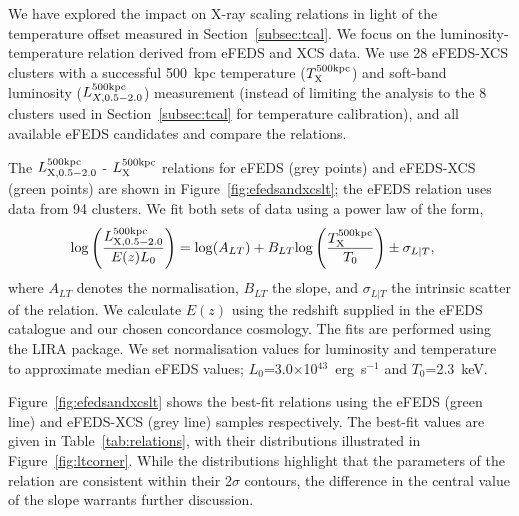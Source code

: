 \documentclass[fleqn,usenatbib]{mnras}
\begin{document}
\label{subsec:LT}
We have explored the impact on X-ray scaling relations in light of the temperature offset measured in Section~\ref{subsec:tcal}.  We focus on the luminosity-temperature relation derived from eFEDS and XCS data.  
We use 28 eFEDS-XCS clusters with a successful 500~kpc temperature ($T^{\rm 500kpc}_{\rm X}$) and soft-band luminosity ($L^{\rm 500kpc}_{X,0.5-2.0}$) measurement (instead of limiting the analysis to the 8 clusters used in Section~\ref{subsec:tcal} for temperature calibration), and all available eFEDS candidates and compare the relations.  

The $L^{500\rm{kpc}}_{\rm{X,0.5-2.0}}$ - $L_{\rm{X}}^{500\rm{kpc}}$ relations for eFEDS (grey points) and eFEDS-XCS (green points) are shown in Figure~\ref{fig:efedsandxcslt}; the eFEDS relation uses data from 94 clusters.
We fit both sets of data using a power law of the form, 
\begin{align}
{\rm log}\left(\frac{L^{500\rm{kpc}}_{\rm{X,0.5-2.0}}}{E(z)L_{0}}\right) &= {\rm log}(A_{LT}) + B_{LT}{\rm log}\left(\frac{T^{\rm{500kpc}}_{\rm{X}}}{T_{0}}\right) \pm \sigma_{L|T},
\label{equ:lt}
\end{align}
where $A_{LT}$ denotes the normalisation, $B_{LT}$ the slope, and $\sigma_{L|T}$ the intrinsic scatter of the relation. We calculate $E(z)$ using the redshift supplied in the eFEDS catalogue and our chosen concordance cosmology. The fits are performed using the LIRA package. We set normalisation values for luminosity and temperature to approximate median eFEDS values;  $L_{0}$=3.0$\times$10$^{43}$~erg~s$^{-1}$ and $T_{0}$=2.3~keV.

Figure~\ref{fig:efedsandxcslt} shows the best-fit relations  using the eFEDS (green line) and eFEDS-XCS (grey line) samples respectively.  The best-fit values are given in Table~\ref{tab:relations}, with their distributions illustrated in Figure~\ref{fig:ltcorner}.  While the distributions highlight that the parameters of the relation are consistent within their 2$\sigma$ contours, the difference in the central value of the slope warrants further discussion.
\end{document}
